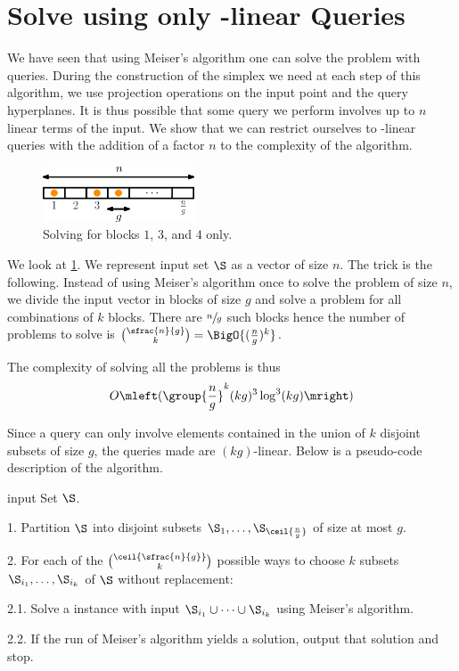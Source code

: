 \section{Solve \kSUM using only -linear Queries}

We have seen that using Meiser's algorithm one can solve the \kSUM problem
with  queries. During the construction of the simplex we
need at each step of this algorithm, we use projection operations on
the input point and the query hyperplanes. It is thus possible that some query we perform
involves up to \(n\) linear terms of the input.
We show that we can restrict ourselves to
-linear queries with the addition of a factor \(n\) to the complexity
of the algorithm.

\begin{figure}
\centering
\includegraphics[width=0.4\textwidth]{fig/point-location/blocks}
\caption{Solving \kSUM for blocks \(1\), \(3\), and \(4\) only.}
\label{fig:point-location:on:blocks}
\end{figure}

We look at \ref{fig:point-location:on:blocks}. We represent input set \(\S\)
as a vector of size \(n\). The trick is the
following. Instead of using Meiser's algorithm once to solve the problem of
size \(n\), we divide the input vector in blocks of size \(g\) and solve a
\kSUM problem for all combinations of \(k\) blocks. There are \(\sfrac{n}{g}\)
such blocks hence the number of problems to solve is \(\binom{\sfrac{n}{g}}{k}
= \BigO{(\frac{n}{g})^k} \).

The complexity of solving all the problems is thus
\begin{displaymath}
O\mleft(\group{\frac{n}{g}}^k (kg)^3 \log^3 (kg)\mright)
\end{displaymath}

Since a query can only involve elements contained in the union of \(k\)
disjoint subsets of size \(g\), the queries made are \((kg)\)-linear. Below is
a pseudo-code description of the algorithm.
\begin{algorithm}
\item[input] Set \(\S\).
\item[1.] Partition \(\S\) into disjoint subsets
\(\S_1,\ldots,\S_{\ceil{\frac{n}{g}}}\) of size at most \(g\).
\item[2.] For each of the \(\binom{\ceil{\sfrac{n}{g}}}{k}\) possible ways to
choose \(k\) subsets \(\S_{i_1},\ldots,\S_{i_k}\) of \(\S\) without
replacement:
\item[2.1.] Solve a \kSUM instance with input \(\S_{i_1} \cup \cdots \cup
\S_{i_k}\) using Meiser's algorithm.
\item[2.2.] If the run of Meiser's algorithm yields a solution, output that
solution and stop.
\end{algorithm}

